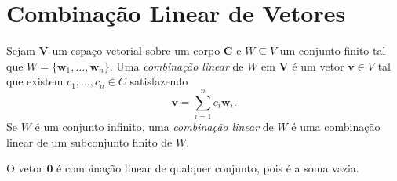 \section{Combinação Linear de Vetores}

\begin{defi}
	Sejam $\bm V$ um espaço vetorial sobre um corpo $\bm C$ e $W \subseteq V$ um conjunto finito tal que $W=\{\bm w_1,\ldots,\bm w_n\}$. Uma \emph{combinação linear} de $W$ em $\bm V$ é um vetor $\bm v \in V$ tal que existem $c_1,\ldots,c_n \in C$ satisfazendo
	\begin{equation*}
	\bm v = \sum_{i=1}^n c_i\bm w_i.
	\end{equation*}
Se $W$ é um conjunto infinito, uma \emph{combinação linear} de $W$ é uma combinação linear de um subconjunto finito de $W$.


\end{defi}

 O vetor $\bm 0$ é combinação linear de qualquer conjunto, pois é a soma vazia.

